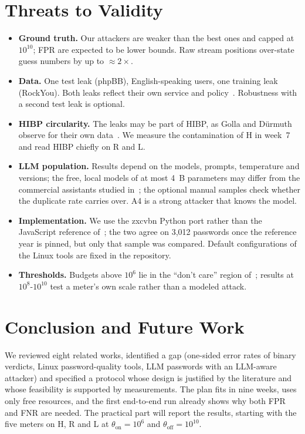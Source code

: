 \documentclass[conference]{IEEEtran}
\begin{document}
\section{Threats to Validity}
\begin{itemize}
\item \textbf{Ground truth.} Our attackers are weaker than the best ones and capped at $10^{10}$; FPR are expected to be lower bounds. Raw stream positions over-state guess numbers by up to $\approx2\times$.
\item \textbf{Data.} One test leak (phpBB), English-speaking users, one training leak (RockYou). Both leaks reflect their own service and policy~\cite{golla2018}. Robustness with a second test leak is optional.
\item \textbf{HIBP circularity.} The leaks may be part of HIBP, as Golla and D\"urmuth observe for their own data~\cite{golla2018}. We measure the contamination of H in week~7 and read HIBP chiefly on R and L.
\item \textbf{LLM population.} Results depend on the models, prompts, temperature and versions; the free, local models of at most 4~B parameters may differ from the commercial assistants studied in~\cite{irregular2026}; the optional manual samples check whether the duplicate rate carries over. A4 is a strong attacker that knows the model.
\item \textbf{Implementation.} We use the zxcvbn Python port rather than the JavaScript reference of~\cite{wheeler2016,golla2018}; the two agree on 3{,}012 passwords once the reference year is pinned, but only that sample was compared. Default configurations of the Linux tools are fixed in the repository.
\item \textbf{Thresholds.} Budgets above $10^6$ lie in the ``don't care'' region of~\cite{florencio2016}; results at $10^8$-$10^{10}$ test a meter's own scale rather than a modeled attack.
\end{itemize}

\section{Conclusion and Future Work}
We reviewed eight related works, identified a gap (one-sided error rates of binary verdicts, Linux password-quality tools, LLM passwords with an LLM-aware attacker) and specified a protocol whose design is justified by the literature and whose feasibility is supported by measurements. The plan fits in nine weeks, uses only free resources, and the first end-to-end run already shows why both FPR and FNR are needed. The practical part will report the results, starting with the five meters on H, R and L at $\theta_{\text{on}}=10^6$ and $\theta_{\text{off}}=10^{10}$.
\end{document}
